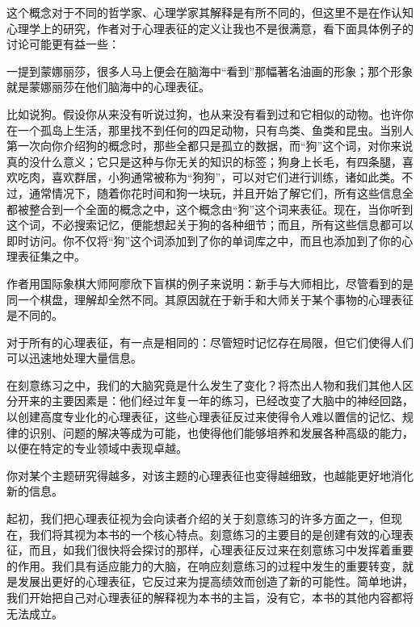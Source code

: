 \documentclass[12pt,oneside]{book}
\begin{document}
这个概念对于不同的哲学家、心理学家其解释是有所不同的，但这里不是在作认知心理学上的研究，作者对于心理表征的定义让我也不是很满意，看下面具体例子的讨论可能更有益一些：

\begin{bookref}[frametitle={\cite{刻意练习}}]
一提到蒙娜丽莎，很多人马上便会在脑海中“看到”那幅著名油画的形象；那个形象就是蒙娜丽莎在他们脑海中的心理表征。

比如说狗。假设你从来没有听说过狗，也从来没有看到过和它相似的动物。也许你在一个孤岛上生活，那里找不到任何的四足动物，只有鸟类、鱼类和昆虫。当别人第一次向你介绍狗的概念时，那些全都只是孤立的数据，而“狗”这个词，对你来说真的没什么意义；它只是这种与你无关的知识的标签；狗身上长毛，有四条腿，喜欢吃肉，喜欢群居，小狗通常被称为“狗狗”，可以对它们进行训练，诸如此类。不过，通常情况下，随着你花时间和狗一块玩，并且开始了解它们，所有这些信息全都被整合到一个全面的概念之中，这个概念由“狗”这个词来表征。现在，当你听到这个词，不必搜索记忆，便能想起关于狗的各种细节；而且，所有这些信息都可以即时访问。你不仅将“狗”这个词添加到了你的单词库之中，而且也添加到了你的心理表征集之中。
\end{bookref}

作者用国际象棋大师阿廖欣下盲棋的例子来说明：新手与大师相比，尽管看到的是同一个棋盘，理解却全然不同。其原因就在于新手和大师关于某个事物的心理表征是不同的。


\begin{bookref}[frametitle={\cite{刻意练习}}]
对于所有的心理表征，有一点是相同的：尽管短时记忆存在局限，但它们使得人们可以迅速地处理大量信息。

在刻意练习之中，我们的大脑究竟是什么发生了变化？将杰出人物和我们其他人区分开来的主要因素是：他们经过年复一年的练习，已经改变了大脑中的神经回路，以创建高度专业化的心理表征，这些心理表征反过来使得令人难以置信的记忆、规律的识别、问题的解决等成为可能，也使得他们能够培养和发展各种高级的能力，以便在特定的专业领域中表现卓越。

你对某个主题研究得越多，对该主题的心理表征也变得越细致，也越能更好地消化新的信息。

起初，我们把心理表征视为会向读者介绍的关于刻意练习的许多方面之一，但现在，我们将其视为本书的一个核心特点。刻意练习的主要目的是创建有效的心理表征，而且，如我们很快将会探讨的那样，心理表征反过来在刻意练习中发挥着重要的作用。我们具有适应能力的大脑，在响应刻意练习的过程中发生的重要转变，就是发展出更好的心理表征，它反过来为提高绩效而创造了新的可能性。简单地讲，我们开始把自己对心理表征的解释视为本书的主旨，没有它，本书的其他内容都将无法成立。
\end{bookref}
\end{document}
